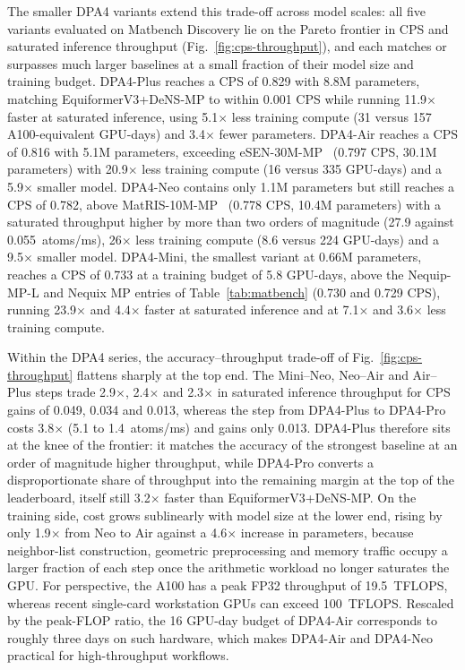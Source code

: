 The smaller DPA4 variants extend this trade-off across model scales: all five variants evaluated on Matbench Discovery lie on the Pareto frontier in CPS and saturated inference throughput (Fig.~\ref{fig:cps-throughput}), and each matches or surpasses much larger baselines at a small fraction of their model size and training budget.
DPA4-Plus reaches a CPS of 0.829 with 8.8M parameters, matching EquiformerV3+DeNS-MP to within 0.001 CPS while running 11.9$\times$ faster at saturated inference, using 5.1$\times$ less training compute (31 versus 157 A100-equivalent GPU-days) and 3.4$\times$ fewer parameters.
DPA4-Air reaches a CPS of 0.816 with 5.1M parameters, exceeding eSEN-30M-MP~\cite{fu2025esen} (0.797 CPS, 30.1M parameters) with 20.9$\times$ less training compute (16 versus 335 GPU-days) and a 5.9$\times$ smaller model.
DPA4-Neo contains only 1.1M parameters but still reaches a CPS of 0.782, above MatRIS-10M-MP~\cite{zhou2026matris} (0.778 CPS, 10.4M parameters) with a saturated throughput higher by more than two orders of magnitude (27.9 against 0.055~atoms/ms), 26$\times$ less training compute (8.6 versus 224 GPU-days) and a 9.5$\times$ smaller model.
DPA4-Mini, the smallest variant at 0.66M parameters, reaches a CPS of 0.733 at a training budget of 5.8 GPU-days, above the Nequip-MP-L and Nequix MP entries of Table~\ref{tab:matbench} (0.730 and 0.729 CPS), running 23.9$\times$ and 4.4$\times$ faster at saturated inference and at 7.1$\times$ and 3.6$\times$ less training compute.

Within the DPA4 series, the accuracy--throughput trade-off of Fig.~\ref{fig:cps-throughput} flattens sharply at the top end.
The Mini--Neo, Neo--Air and Air--Plus steps trade 2.9$\times$, 2.4$\times$ and 2.3$\times$ in saturated inference throughput for CPS gains of 0.049, 0.034 and 0.013, whereas the step from DPA4-Plus to DPA4-Pro costs 3.8$\times$ (5.1 to 1.4~atoms/ms) and gains only 0.013.
DPA4-Plus therefore sits at the knee of the frontier: it matches the accuracy of the strongest baseline at an order of magnitude higher throughput, while DPA4-Pro converts a disproportionate share of throughput into the remaining margin at the top of the leaderboard, itself still 3.2$\times$ faster than EquiformerV3+DeNS-MP.
On the training side, cost grows sublinearly with model size at the lower end, rising by only 1.9$\times$ from Neo to Air against a 4.6$\times$ increase in parameters, because neighbor-list construction, geometric preprocessing and memory traffic occupy a larger fraction of each step once the arithmetic workload no longer saturates the GPU.
For perspective, the A100 has a peak FP32 throughput of 19.5~TFLOPS, whereas recent single-card workstation GPUs can exceed 100~TFLOPS.
Rescaled by the peak-FLOP ratio, the 16 GPU-day budget of DPA4-Air corresponds to roughly three days on such hardware, which makes DPA4-Air and DPA4-Neo practical for high-throughput workflows.

